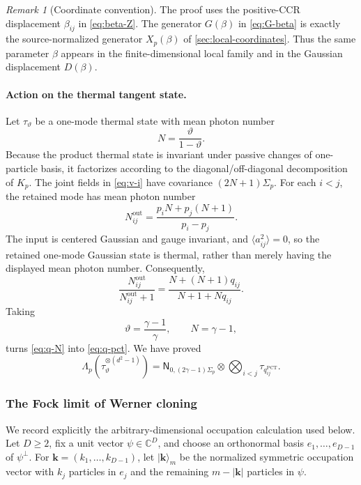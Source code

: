 \documentclass[11pt]{article}
\theoremstyle{remark}
\newtheorem{remark}[remark]{Remark}
\theoremstyle{plain}
\newcommand{\C}{\mathbb C}
\newcommand{\ket}[1]{|#1\rangle}
\newcommand{\ot}{\otimes}
\begin{document}
\begin{remark}[Coordinate convention]
The proof uses the positive-CCR displacement \(\beta_{ij}\) in
\eqref{eq:beta-Z}.  The generator \(G(\beta)\) in
\eqref{eq:G-beta} is exactly the source-normalized generator
\(X_p(\beta)\) of \cref{sec:local-coordinates}.  Thus the same parameter
\(\beta\) appears in the finite-dimensional local family and in the Gaussian
displacement \(D(\beta)\).
\end{remark}

\paragraph{Action on the thermal tangent state.}

Let \(\tau_\vartheta\) be a one-mode thermal state with mean photon number
\[
  N=\frac{\vartheta}{1-\vartheta}.
\]
Because the product thermal state is invariant under passive changes of
one-particle basis, it factorizes according to the diagonal/off-diagonal
decomposition of \(K_p\).  The joint fields in \eqref{eq:v-i} have covariance
\((2N+1)\Sigma_p\).  For each \(i<j\), the retained mode has mean photon
number
\begin{equation}\label{eq:N-out}
  N_{ij}^{\mathrm{out}}
  =\frac{p_iN+p_j(N+1)}{p_i-p_j}.
\end{equation}
The input is centered Gaussian and gauge invariant, and
\(\langle a_{ij}^2\rangle=0\), so the retained one-mode Gaussian state is
thermal, rather than merely having the displayed mean photon number.
Consequently,
\begin{equation}\label{eq:q-N}
  \frac{N_{ij}^{\mathrm{out}}}{N_{ij}^{\mathrm{out}}+1}
  =\frac{N+(N+1)q_{ij}}{N+1+Nq_{ij}}.
\end{equation}
Taking
\[
  \vartheta=\frac{\gamma-1}{\gamma},
  \qquad N=\gamma-1,
\]
turns \eqref{eq:q-N} into \eqref{eq:q-pct}.  We have proved
\begin{equation}\label{eq:thermal-channel-output}
  \Lambda_p\!\left(
    \tau_\vartheta^{\ot(d^2-1)}
  \right)
  =\mathsf N_{0,(2\gamma-1)\Sigma_p}
   \ot\bigotimes_{i<j}\tau_{q_{ij}^{\mathrm{PCT}}}.
\end{equation}

\subsubsection{The Fock limit of Werner cloning}

We record explicitly the arbitrary-dimensional occupation calculation used
below.  Let \(D\ge2\), fix a unit vector \(\psi\in\C^D\), and choose an
orthonormal basis \(e_1,\ldots,e_{D-1}\) of \(\psi^\perp\).  For
\(\mathbf k=(k_1,\ldots,k_{D-1})\), let \(\ket{\mathbf k}_m\) be the
normalized symmetric occupation vector with \(k_j\) particles in \(e_j\)
and the remaining \(m-|\mathbf k|\) particles in \(\psi\).
\end{document}
